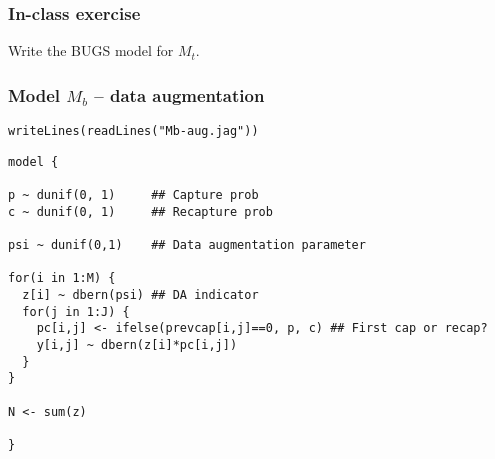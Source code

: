 \documentclass[color=usenames,dvipsnames]{beamer}\usepackage[]{graphicx}\usepackage[]{color}
\makeatletter
\newcommand{\hlstr}[1]{\textcolor[rgb]{0.749,0.012,0.012}{#1}}%
\newcommand{\hlstd}[1]{\textcolor[rgb]{0,0,0}{#1}}%
\newcommand{\hlkwd}[1]{\textcolor[rgb]{0.004,0.004,0.506}{#1}}%
\newenvironment{kframe}{%
 \def\at@end@of@kframe{}%
 \ifinner\ifhmode%
  \def\at@end@of@kframe{\end{minipage}}%
  \begin{minipage}{\columnwidth}%
 \fi\fi%
 \def\FrameCommand##1{\hskip\@totalleftmargin \hskip-\fboxsep
 \colorbox{shadecolor}{##1}\hskip-\fboxsep
     \hskip-\linewidth \hskip-\@totalleftmargin \hskip\columnwidth}%
 \MakeFramed {\advance\hsize-\width
   \@totalleftmargin\z@ \linewidth\hsize
   \@setminipage}}%
 {\par\unskip\endMakeFramed%
 \at@end@of@kframe}
\newenvironment{knitrout}{}{} %
\makeatother
\begin{document}
\begin{frame}
  \frametitle{In-class exercise}
  \centering
  \large
  Write the BUGS model for $M_t$. \\
\end{frame}






\begin{frame}[fragile]
  \frametitle{Model $M_b$ -- data augmentation}
\vspace{-3pt}
\begin{knitrout}\footnotesize
{}\color{fgcolor}\begin{kframe}
\begin{alltt}
\hlkwd{writeLines}\hlstd{(}\hlkwd{readLines}\hlstd{(}\hlstr{"Mb-aug.jag"}\hlstd{))}
\end{alltt}
\begin{verbatim}
model {

p ~ dunif(0, 1)     ## Capture prob
c ~ dunif(0, 1)     ## Recapture prob

psi ~ dunif(0,1)    ## Data augmentation parameter

for(i in 1:M) {     
  z[i] ~ dbern(psi) ## DA indicator
  for(j in 1:J) {
    pc[i,j] <- ifelse(prevcap[i,j]==0, p, c) ## First cap or recap?
    y[i,j] ~ dbern(z[i]*pc[i,j])
  }
}

N <- sum(z)

}
\end{verbatim}
\end{kframe}
\end{knitrout}
\end{frame}
\end{document}
